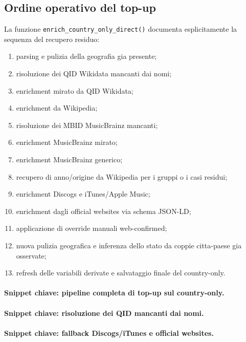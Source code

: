 \documentclass[11pt]{article}
\begin{document}
\subsection{Ordine operativo del top-up}
La funzione \texttt{enrich\_country\_only\_direct()} documenta esplicitamente la sequenza del recupero residuo:
\begin{enumerate}[leftmargin=2em]
\item parsing e pulizia della geografia gia presente;
\item risoluzione dei QID Wikidata mancanti dai nomi;
\item enrichment mirato da QID Wikidata;
\item enrichment da Wikipedia;
\item risoluzione dei MBID MusicBrainz mancanti;
\item enrichment MusicBrainz mirato;
\item enrichment MusicBrainz generico;
\item recupero di anno/origine da Wikipedia per i gruppi o i casi residui;
\item enrichment Discogs e iTunes/Apple Music;
\item enrichment dagli official websites via schema JSON-LD;
\item applicazione di override manuali web-confirmed;
\item nuova pulizia geografica e inferenza dello stato da coppie citta-paese gia osservate;
\item refresh delle variabili derivate e salvataggio finale del country-only.
\end{enumerate}

\paragraph{Snippet chiave: pipeline completa di top-up sul country-only.}


\paragraph{Snippet chiave: risoluzione dei QID mancanti dai nomi.}


\paragraph{Snippet chiave: fallback Discogs/iTunes e official websites.}

\end{document}
